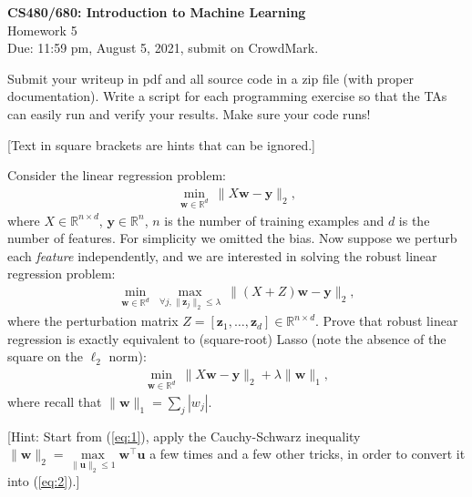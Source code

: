 \documentclass[10pt,letter,notitlepage]{article}
\newcommand{\RR}{\mathds{R}}
\newcommand{\wv}{\mathbf{w}}
\newcommand{\yv}{\mathbf{y}}
\newcommand{\zv}{\mathbf{z}}
\newcommand{\uv}{\mathbf{u}}
\newcounter{exercise}
\begin{document}
\begin{center}
\large{\textbf{CS480/680: Introduction to Machine Learning} \\ Homework 5\\ Due: 11:59 pm, August 5, 2021, submit on CrowdMark.} \\
\end{center}

\begin{center}
Submit your writeup in pdf and all source code in a zip file (with proper documentation). Write a script for each programming exercise so that the TAs can easily run and verify your results. Make sure your code runs!

[Text in square brackets are hints that can be ignored.]
\end{center}
\begin{exercise}
	Consider the linear regression problem:
	\begin{align}
	\min_{\wv \in \RR^d} ~ \|X \wv - \yv\|_2,
	\end{align}
	where $X \in \RR^{n \times d}$, $\yv \in \RR^n$, $n$ is the number of training examples and $d$ is the number of features. For simplicity we omitted the bias. Now suppose we perturb each \emph{feature} independently, and we are interested in solving the robust linear regression problem:
	\begin{align}
    \min_{\wv\in\RR^d} ~ \max_{\forall j, \|\zv_j\|_2 \leq \lambda} ~ \|(X + Z)\wv - \yv\|_2, \label{eq:1}
	\end{align}
	where the perturbation matrix $Z = [\zv_1, \ldots, \zv_d] \in \RR^{n \times d}$. Prove that robust linear regression is exactly equivalent to (square-root) Lasso (note the absence of the square on the $\ell_2$ norm):
	\begin{align}
    \min_{\wv \in \RR^d} ~ \| X \wv - \yv\|_2 + \lambda\|\wv\|_1, \label{eq:2}
	\end{align}
	where recall that $\|\wv\|_1 = \sum_j |w_j|$.

  [Hint: Start from (\ref{eq:1}), apply the Cauchy-Schwarz inequality $\|\wv\|_2 = \max\limits_{\|\uv\|_2 \leq 1} \wv^\top\uv$ a few times and a few other tricks, in order to convert it into (\ref{eq:2}).]

\end{exercise}
\end{document}
